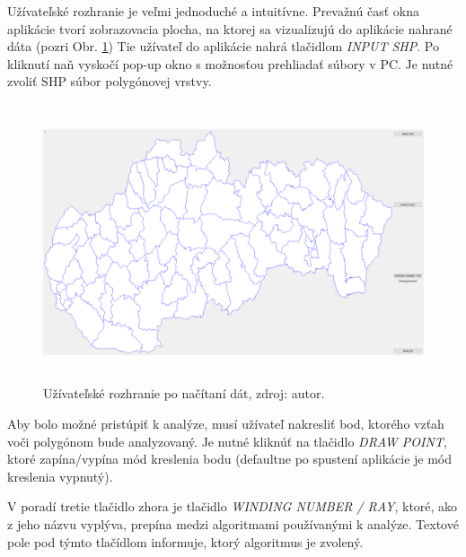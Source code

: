 \documentclass[11pt]{article}
\begin{document}
Užívateľské rozhranie je veľmi jednoduché a intuitívne. Prevažnú časť okna aplikácie tvorí zobrazovacia plocha, na ktorej sa vizualizujú do aplikácie nahrané dáta (pozri Obr. \ref{fig:obr4}) Tie užívateľ do aplikácie nahrá tlačidlom \textit{INPUT SHP}. Po kliknutí naň vyskočí pop-up okno s možnosťou prehliadať súbory v PC. Je nutné zvoliť SHP súbor polygónovej vrstvy.

\begin{figure}[h]
    \includegraphics[width=15.65cm, height=8.2cm]{obr5.png}
    \centering
    \caption{Užívateľské rozhranie po načítaní dát, zdroj: autor.}
    \label{fig:obr4}
\end{figure}

Aby bolo možné pristúpiť k analýze, musí užívateľ nakresliť bod, ktorého vzťah voči polygónom bude analyzovaný. Je nutné kliknúť na tlačidlo \textit{DRAW POINT}, ktoré zapína/vypína mód kreslenia bodu (defaultne po spustení aplikácie je mód kreslenia vypnutý).

V poradí tretie tlačidlo zhora je tlačidlo \textit{WINDING NUMBER / RAY}, ktoré, ako z jeho názvu vyplýva, prepína medzi algoritmami používanými k analýze. Textové pole pod týmto tlačídlom informuje, ktorý algoritmus je zvolený.
\end{document}
